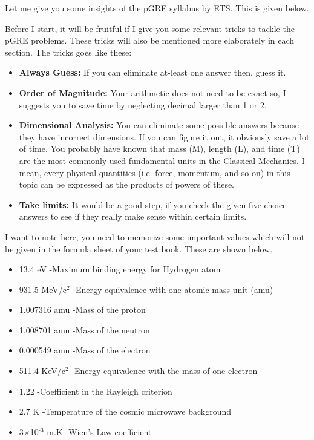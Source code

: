 \documentclass[12pt,a4paper]{article}
\begin{document}
Let me give you some insights of the pGRE syllabus by ETS. This is given below.


\tableofcontents


\vspace*{1cm}
Before I start, it will be fruitful if I give you some relevant tricks to tackle the pGRE problems. These tricks will also be mentioned more elaborately in each section. The tricks goes like these:

\begin{itemize}

\item \textbf{Always Guess:} If you can eliminate at-least one answer then, guess it.

\item \textbf{Order of Magnitude:} Your arithmetic does not need to be exact so, I suggests you to save time by neglecting decimal larger than 1 or 2.

\item \textbf{Dimensional Analysis:} You can eliminate some possible answers because they have incorrect dimensions. If you can figure it out, it obviously save a lot of time. You probably have known that mass (M), length (L), and time (T) are the most commonly used fundamental units in the Classical Mechanics. I mean, every physical quantities (i.e. force, momentum, and so on) in this topic can be expressed as the products of powers of these.

\item \textbf{Take limits:} It would be a good step, if you check the given five choice answers to see if they really make sense within certain limits.

\end{itemize}

I want to note here, you need to memorize some important values which will not be given in the formula sheet of your test book. These are shown below.

\begin{itemize}
\item 13.4 eV -Maximum binding energy for Hydrogen atom 
\item 931.5 MeV/c$^{\text{2}}$ -Energy equivalence with one atomic mass unit (amu)
\item 1.007316 amu -Mass of the proton
\item 1.008701 amu -Mass of the neutron 
\item 0.000549 amu -Mass of the electron 
\item 511.4 KeV/c$^{\text{2}}$ -Energy equivalence with the mass of one electron
\item 1.22 -Coefficient in the Rayleigh criterion
\item 2.7 K -Temperature of the cosmic microwave background
\item 3$\times$10$^{\text{-3}}$ m.K -Wien's Law coefficient
\end{itemize}
\end{document}
